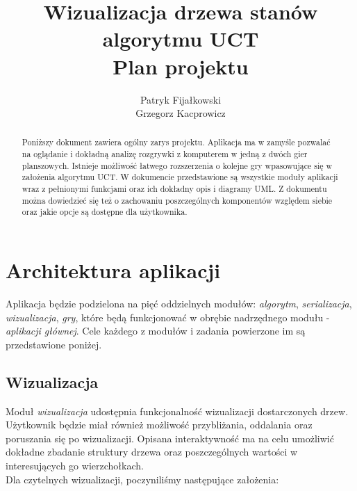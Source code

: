 \documentclass{article}
\title{
	Wizualizacja drzewa stanów algorytmu UCT \\
	\large Plan projektu}
\author{Patryk Fijałkowski \\ Grzegorz Kacprowicz}
\let\oldsection\section
\renewcommand\section{\clearpage\oldsection}
\newcommand{\modulename}[1]{\textit{#1}}
\begin{document}
	\begin{titlingpage}
		\maketitle
		\vspace{3cm}
		\begin{abstract}
			Poniższy dokument zawiera ogólny zarys projektu. Aplikacja ma w zamyśle pozwalać na oglądanie i dokładną analizę rozgrywki z komputerem w jedną z dwóch gier planszowych. Istnieje możliwość łatwego rozszerzenia o kolejne gry wpasowujące się w założenia algorytmu UCT. W dokumencie przedstawione są wszystkie moduły aplikacji wraz z pełnionymi funkcjami oraz ich dokładny opis i diagramy UML. Z dokumentu można dowiedzieć się też o zachowaniu poszczególnych komponentów względem siebie oraz jakie opcje są dostępne dla użytkownika. 
		\end{abstract}
	\end{titlingpage}

	\begin{versionhistory}
	\end{versionhistory}
	\tableofcontents
	
	\section{Architektura aplikacji}
	Aplikacja będzie podzielona na pięć oddzielnych modułów: \modulename{algorytm}, \modulename{serializacja}, \modulename{wizualizacja}, \modulename{gry}, które będą funkcjonować w obrębie nadrzędnego modułu - \modulename{aplikacji głównej}. Cele każdego z modułów i zadania powierzone im są przedstawione poniżej.
	
	\subsection{Wizualizacja}
	Moduł \modulename{wizualizacja} udostępnia funkcjonalność wizualizacji dostarczonych drzew. Użytkownik będzie miał również możliwość przybliżania, oddalania oraz poruszania się po wizualizacji. Opisana interaktywność ma na celu umożliwić dokładne zbadanie struktury drzewa oraz poszczególnych wartości w interesujących go wierzchołkach. \\
	
	\noindent Dla czytelnych wizualizacji, poczyniliśmy następujące założenia: \\
	
\end{document}
